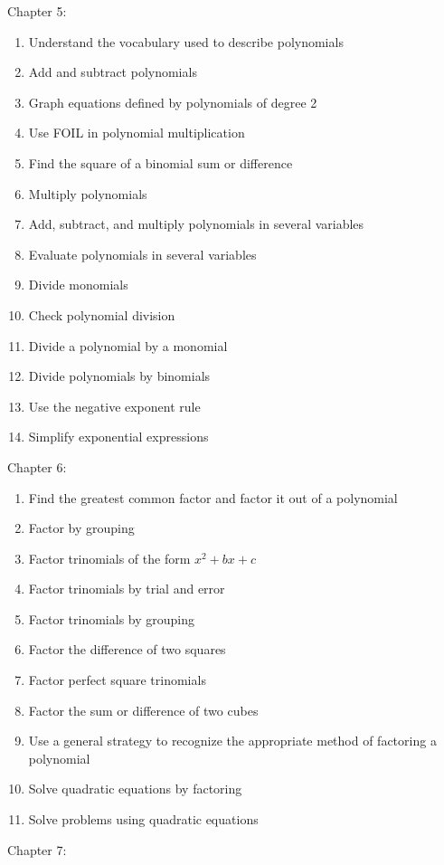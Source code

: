 \documentclass[11pt]{article}
\newenvironment{alphalist}{
  \begin{enumerate}[(1)]
    \addtolength{\itemsep}{-1.0\itemsep}}
  {\end{enumerate}}
\begin{document}
\noindent Chapter 5:
 \begin{alphalist}
    \item Understand the vocabulary used to describe polynomials
    \item Add and subtract polynomials
    \item Graph equations defined by polynomials of degree 2
    \item Use FOIL in polynomial multiplication
    \item Find the square of a binomial sum or difference
    \item Multiply polynomials
    \item Add, subtract, and multiply polynomials in several variables
    \item Evaluate polynomials in several variables
    \item Divide monomials
    \item Check polynomial division
    \item Divide a polynomial by a monomial 
    \item Divide polynomials by binomials
    \item Use the negative exponent rule
    \item Simplify exponential expressions
 \end{alphalist}
\noindent Chapter 6:
 \begin{alphalist}
    \item Find the greatest common factor and factor it out of a polynomial
    \item Factor by grouping
    \item Factor trinomials of the form $x^2 + bx + c$
    \item Factor trinomials by trial and error
    \item Factor trinomials by grouping
    \item Factor the difference of two squares
    \item Factor perfect square trinomials
    \item Factor the sum or difference of two cubes
    \item Use a general strategy to recognize the appropriate method of factoring a polynomial
    \item Solve quadratic equations by factoring
    \item Solve problems using quadratic equations
 \end{alphalist}
\noindent Chapter 7:
\end{document}
